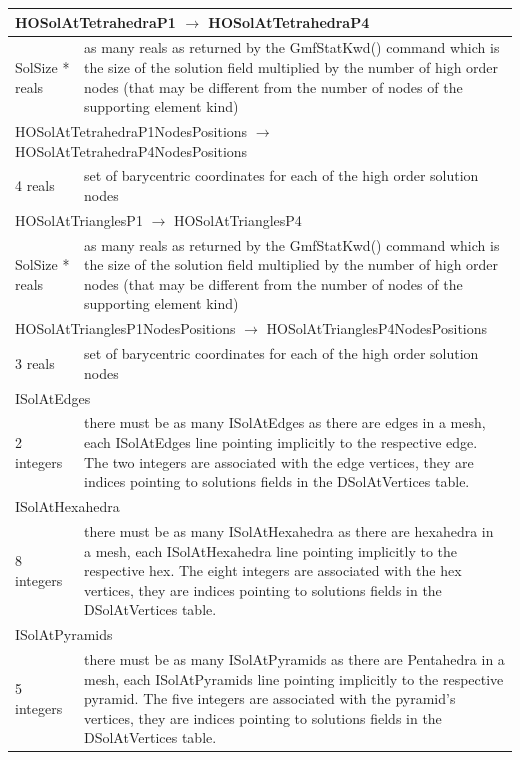\documentclass[a4paper,12pt]{article}
\begin{document}
\begin{longtable}{|m{4cm}|m{11cm}|}
\multicolumn{2}{|l|}{HOSolAtTetrahedraP1 $\rightarrow$ HOSolAtTetrahedraP4} \\
\hline
SolSize * reals & as many reals as returned by the GmfStatKwd() command which is the size of the solution field multiplied by the number of high order nodes (that may be different from the number of nodes of the supporting element kind)\\
\hline\hline

\multicolumn{2}{|l|}{HOSolAtTetrahedraP1NodesPositions $\rightarrow$ HOSolAtTetrahedraP4NodesPositions} \\
\hline
4 reals & set of barycentric coordinates for each of the high order solution nodes \\
\hline\hline

\multicolumn{2}{|l|}{HOSolAtTrianglesP1 $\rightarrow$ HOSolAtTrianglesP4} \\
\hline
SolSize * reals & as many reals as returned by the GmfStatKwd() command which is the size of the solution field multiplied by the number of high order nodes (that may be different from the number of nodes of the supporting element kind)\\
\hline\hline

\multicolumn{2}{|l|}{HOSolAtTrianglesP1NodesPositions $\rightarrow$ HOSolAtTrianglesP4NodesPositions} \\
\hline
3 reals & set of barycentric coordinates for each of the high order solution nodes \\
\hline\hline

\multicolumn{2}{|l|}{ISolAtEdges} \\
\hline
2 integers & there must be as many ISolAtEdges as there are edges in a mesh, each ISolAtEdges line pointing implicitly to the respective edge. The two integers are associated with the edge vertices, they are indices pointing to solutions fields in the DSolAtVertices table. \\
\hline\hline

\multicolumn{2}{|l|}{ISolAtHexahedra} \\
\hline
8 integers & there must be as many ISolAtHexahedra as there are hexahedra in a mesh, each ISolAtHexahedra line pointing implicitly to the respective hex. The eight integers are associated with the hex vertices, they are indices pointing to solutions fields in the DSolAtVertices table. \\
\hline\hline

\multicolumn{2}{|l|}{ISolAtPyramids} \\
\hline
5 integers & there must be as many ISolAtPyramids as there are Pentahedra in a mesh, each ISolAtPyramids line pointing implicitly to the respective pyramid. The five integers are associated with the pyramid's vertices, they are indices pointing to solutions fields in the DSolAtVertices table. \\
\hline\hline


\end{longtable}
\end{document}
